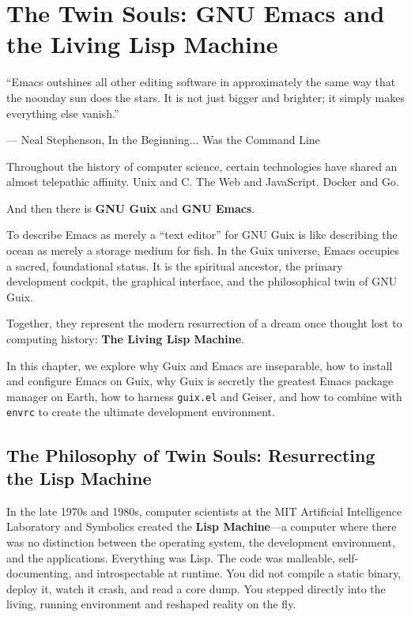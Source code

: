 \chapter{The Twin Souls: GNU Emacs and the Living Lisp Machine}
\label{chap:emacs-and-guix}

\epigraph{``Emacs outshines all other editing software in approximately the same way that the noonday sun does the stars. It is not just bigger and brighter; it simply makes everything else vanish.''}{--- Neal Stephenson, In the Beginning... Was the Command Line}

\noindent
Throughout the history of computer science, certain technologies have shared an almost telepathic affinity. Unix and C. The Web and JavaScript. Docker and Go. 

And then there is \textbf{GNU Guix} and \textbf{GNU Emacs}.

To describe Emacs as merely a ``text editor'' for GNU Guix is like describing the ocean as merely a storage medium for fish. In the Guix universe, Emacs occupies a sacred, foundational status. It is the spiritual ancestor, the primary development cockpit, the graphical interface, and the philosophical twin of GNU Guix. 

Together, they represent the modern resurrection of a dream once thought lost to computing history: \textbf{The Living Lisp Machine}.

In this chapter, we explore why Guix and Emacs are inseparable, how to install and configure Emacs on Guix, why Guix is secretly the greatest Emacs package manager on Earth, how to harness \texttt{guix.el} and Geiser, and how to combine  with \texttt{envrc} to create the ultimate development environment.

\section{The Philosophy of Twin Souls: Resurrecting the Lisp Machine}

In the late 1970s and 1980s, computer scientists at the MIT Artificial Intelligence Laboratory and Symbolics created the \textbf{Lisp Machine}---a computer where there was no distinction between the operating system, the development environment, and the applications. Everything was Lisp. The code was malleable, self-documenting, and introspectable at runtime. You did not compile a static binary, deploy it, watch it crash, and read a core dump. You stepped directly into the living, running environment and reshaped reality on the fly.

